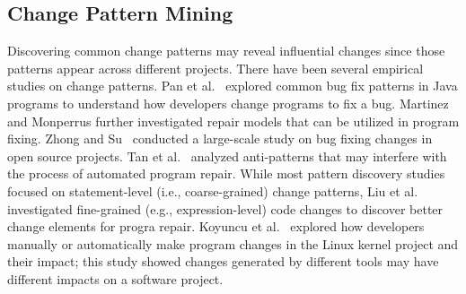 \subsection{Change Pattern Mining}
Discovering common change patterns may reveal influential changes since those patterns
appear across different projects.
There have been several empirical studies on change patterns.
Pan et al.~\cite{pan2009toward} explored common bug fix patterns in Java programs to understand how developers change programs to fix a bug. 
Martinez and Monperrus further investigated repair models that can be utilized in program fixing. Zhong and Su~\cite{zhong2015empirical} conducted a large-scale study on bug fixing changes in open source projects. Tan et al.~\cite{tan2016anti} analyzed anti-patterns that may interfere with the process of automated program repair. 
While most pattern discovery studies focused on statement-level (i.e., coarse-grained) change patterns, 
Liu et al.~\cite{liu_closer_2018} investigated fine-grained (e.g., expression-level) code changes to
discover better change elements for progra repair.
Koyuncu et al.~\cite{koyuncu2017impact} explored how developers manually or automatically make program changes in
the Linux kernel project and their impact; this study showed changes generated by different tools may have 
different impacts on a software project.


